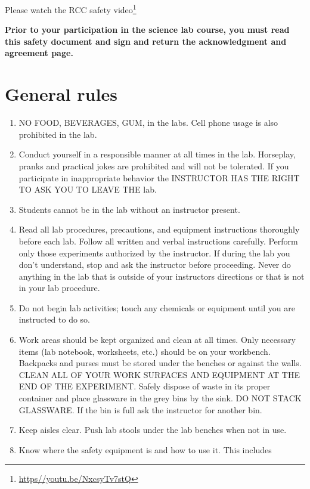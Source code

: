\documentclass[]{book}
\providecommand{\tightlist}{%
  \setlength{\itemsep}{0pt}\setlength{\parskip}{0pt}}
\let\rmarkdownfootnote\footnote%
\def\footnote{\protect\rmarkdownfootnote}
\renewcommand{\href}[2]{#2\footnote{\url{#1}}}
\theoremstyle{definition}
\theoremstyle{definition}
\theoremstyle{definition}
\theoremstyle{remark}
\let\BeginKnitrBlock\begin \let\EndKnitrBlock\end
\begin{document}
Please watch the \href{https//youtu.be/NxcsyTv7stQ}{RCC safety video}

\BeginKnitrBlock{rmdimportant}
\textbf{Prior to your participation in the science lab course, you must
read this safety document and sign and return the acknowledgment and
agreement page.}
\EndKnitrBlock{rmdimportant}

\section{General rules}\label{general-rules}

\begin{enumerate}
\def\labelenumi{\arabic{enumi}.}
\tightlist
\item
  NO FOOD, BEVERAGES, GUM, in the labs. Cell phone usage is also
  prohibited in the lab.
\item
  Conduct yourself in a responsible manner at all times in the lab.
  Horseplay, pranks and practical jokes are prohibited and will not be
  tolerated. If you participate in inappropriate behavior the INSTRUCTOR
  HAS THE RIGHT TO ASK YOU TO LEAVE THE lab.
\item
  Students cannot be in the lab without an instructor present.
\item
  Read all lab procedures, precautions, and equipment instructions
  thoroughly before each lab. Follow all written and verbal instructions
  carefully. Perform only those experiments authorized by the
  instructor. If during the lab you don't understand, stop and ask the
  instructor before proceeding. Never do anything in the lab that is
  outside of your instructors directions or that is not in your lab
  procedure.
\item
  Do not begin lab activities; touch any chemicals or equipment until
  you are instructed to do so.
\item
  Work areas should be kept organized and clean at all times. Only
  necessary items (lab notebook, worksheets, etc.) should be on your
  workbench. Backpacks and purses must be stored under the benches or
  against the walls. CLEAN ALL OF YOUR WORK SURFACES AND EQUIPMENT AT
  THE END OF THE EXPERIMENT. Safely dispose of waste in its proper
  container and place glassware in the grey bins by the sink. DO NOT
  STACK GLASSWARE. If the bin is full ask the instructor for another
  bin.
\item
  Keep aisles clear. Push lab stools under the lab benches when not in
  use.
\item
  Know where the safety equipment is and how to use it. This includes

\end{enumerate}
\end{document}
